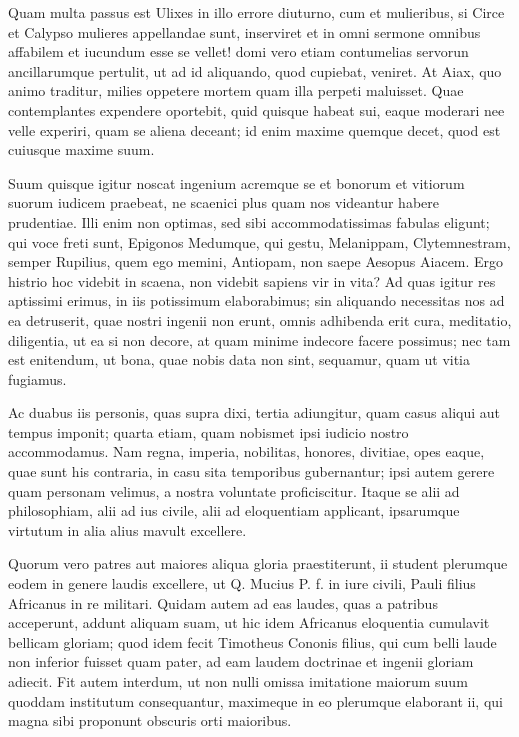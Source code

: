  Quam multa passus est Ulixes in illo errore diuturno, cum et mulieribus, si Circe et Calypso mulieres appellandae sunt, inserviret et in omni sermone omnibus affabilem et iucundum esse se vellet! domi vero etiam contumelias servorun ancillarumque pertulit, ut ad id aliquando, quod cupiebat, veniret. At Aiax, quo animo traditur, milies oppetere mortem quam illa perpeti maluisset. Quae contemplantes expendere oportebit, quid quisque habeat sui, eaque moderari nee velle experiri, quam se aliena deceant; id enim maxime quemque decet, quod est cuiusque maxime suum.

 Suum quisque igitur noscat ingenium acremque se et bonorum et vitiorum suorum iudicem praebeat, ne scaenici plus quam nos videantur habere prudentiae. Illi enim non optimas, sed sibi accommodatissimas fabulas eligunt; qui voce freti sunt, Epigonos Medumque, qui gestu, Melanippam, Clytemnestram, semper Rupilius, quem ego memini, Antiopam, non saepe Aesopus Aiacem. Ergo histrio hoc videbit in scaena, non videbit sapiens vir in vita? Ad quas igitur res aptissimi erimus, in iis potissimum elaborabimus; sin aliquando necessitas nos ad ea detruserit, quae nostri ingenii non erunt, omnis adhibenda erit cura, meditatio, diligentia, ut ea si non decore, at quam minime indecore facere possimus; nec tam est enitendum, ut bona, quae nobis data non sint, sequamur, quam ut vitia fugiamus.

 Ac duabus iis personis, quas supra dixi, tertia adiungitur, quam casus aliqui aut tempus imponit; quarta etiam, quam nobismet ipsi iudicio nostro accommodamus. Nam regna, imperia, nobilitas, honores, divitiae, opes eaque, quae sunt his contraria, in casu sita temporibus gubernantur; ipsi autem gerere quam personam velimus, a nostra voluntate proficiscitur. Itaque se alii ad philosophiam, alii ad ius civile, alii ad eloquentiam applicant, ipsarumque virtutum in alia alius mavult excellere.

 Quorum vero patres aut maiores aliqua gloria praestiterunt, ii student plerumque eodem in genere laudis excellere, ut Q. Mucius P. f. in iure civili, Pauli filius Africanus in re militari. Quidam autem ad eas laudes, quas a patribus acceperunt, addunt aliquam suam, ut hic idem Africanus eloquentia cumulavit bellicam gloriam; quod idem fecit Timotheus Cononis filius, qui cum belli laude non inferior fuisset quam pater, ad eam laudem doctrinae et ingenii gloriam adiecit. Fit autem interdum, ut non nulli omissa imitatione maiorum suum quoddam institutum consequantur, maximeque in eo plerumque elaborant ii, qui magna sibi proponunt obscuris orti maioribus.


